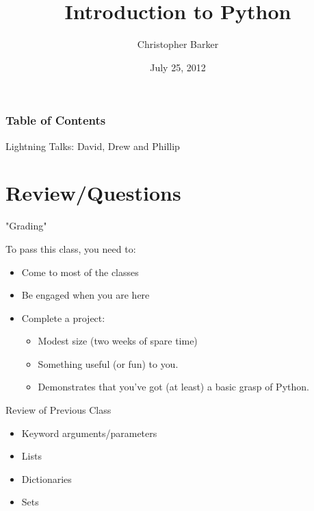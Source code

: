 \documentclass{beamer}
\title[Week 5: Building a Web Server from Scratch]{Introduction to Python}
\author{Christopher Barker}
\institute{UW Continuing Education / Isilon}
\date{July 25, 2012}
\begin{document}
\begin{frame}
  \titlepage
\end{frame}

\begin{frame}
\frametitle{Table of Contents}
  \tableofcontents

\vfill
Lightning Talks: David, Drew and Phillip
\end{frame}


\section{Review/Questions}


\begin{frame}{"Grading"}

{\Large To pass this class, you need to:}

\begin{itemize}
  \item Come to most of the classes
  \item Be engaged when you are here
  \item Complete a project:
  \begin{itemize}
      \item Modest size (two weeks of spare time)
      \item Something useful (or fun) to you.
      \item Demonstrates that you've got (at least) a basic grasp of Python.
  \end{itemize}
\end{itemize}

\end{frame}


\begin{frame}{Review of Previous Class}

\begin{itemize}
  \item Keyword arguments/parameters
  \item Lists
  \item Dictionaries
  \item Sets
\end{itemize}

\end{frame}
\end{document}
